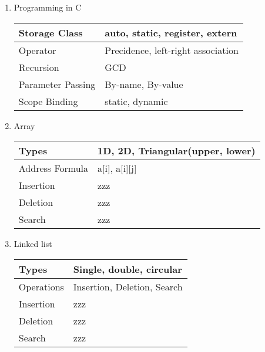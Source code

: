 \begin{enumerate}

    \item   Programming in C \\
        \begin{myTableStyle} \begin{tabular}{ |m{4cm}|m{12cm}| } \hline
                Storage Class             &     auto, static, register, extern         \\ \hline
                Operator      &     Precidence, left-right association    \\ \hline
                Recursion     &     GCD    \\ \hline
                Parameter Passing     &     By-name, By-value    \\ \hline
                Scope Binding     &     static, dynamic    \\ \hline
        \end{tabular} \end{myTableStyle} \vspace{0.08in}

    \item Array \\
        \begin{myTableStyle} \begin{tabular}{ |m{4cm}|m{12cm}| } \hline
                Types               &     1D, 2D, Triangular(upper, lower)    \\ \hline
                Address Formula     &     a[i], a[i][j]    \\ \hline
                Insertion           &     zzz    \\ \hline
                Deletion            &     zzz    \\ \hline
                Search              &     zzz    \\ \hline
        \end{tabular} \end{myTableStyle} \vspace{0.08in}

    \item Linked list \\
        \begin{myTableStyle} \begin{tabular}{ |m{4cm}|m{12cm}| } \hline
                Types           &     Single, double, circular    \\ \hline
                Operations      &     Insertion, Deletion, Search    \\ \hline
                Insertion       &     zzz    \\ \hline
                Deletion        &     zzz    \\ \hline
                Search          &     zzz    \\ \hline
        \end{tabular} \end{myTableStyle} \vspace{0.08in}


\end{enumerate}
